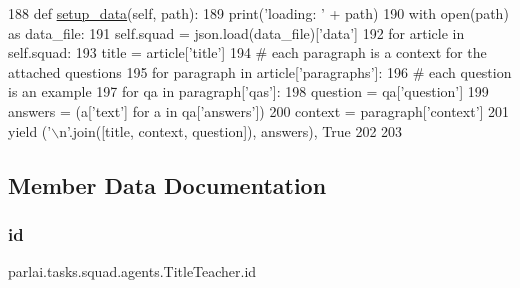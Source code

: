 \begin{DoxyCode}
188     \textcolor{keyword}{def }\hyperlink{namespaceparlai_1_1tasks_1_1multinli_1_1agents_a4fa2cb0ba1ed745336ad8bceed36b841}{setup\_data}(self, path):
189         print(\textcolor{stringliteral}{'loading: '} + path)
190         with open(path) \textcolor{keyword}{as} data\_file:
191             self.squad = json.load(data\_file)[\textcolor{stringliteral}{'data'}]
192         \textcolor{keywordflow}{for} article \textcolor{keywordflow}{in} self.squad:
193             title = article[\textcolor{stringliteral}{'title'}]
194             \textcolor{comment}{# each paragraph is a context for the attached questions}
195             \textcolor{keywordflow}{for} paragraph \textcolor{keywordflow}{in} article[\textcolor{stringliteral}{'paragraphs'}]:
196                 \textcolor{comment}{# each question is an example}
197                 \textcolor{keywordflow}{for} qa \textcolor{keywordflow}{in} paragraph[\textcolor{stringliteral}{'qas'}]:
198                     question = qa[\textcolor{stringliteral}{'question'}]
199                     answers = (a[\textcolor{stringliteral}{'text'}] \textcolor{keywordflow}{for} a \textcolor{keywordflow}{in} qa[\textcolor{stringliteral}{'answers'}])
200                     context = paragraph[\textcolor{stringliteral}{'context'}]
201                     \textcolor{keywordflow}{yield} (\textcolor{stringliteral}{'\(\backslash\)n'}.join([title, context, question]), answers), \textcolor{keyword}{True}
202 
203 
\end{DoxyCode}


\subsection{Member Data Documentation}
\mbox{\label{classparlai_1_1tasks_1_1squad_1_1agents_1_1TitleTeacher_afc29efc5cf9c9800f0cb5d9346b48f61}} 
\subsubsection{\texorpdfstring{id}{id}}
{\footnotesize\ttfamily parlai.\+tasks.\+squad.\+agents.\+Title\+Teacher.\+id}



